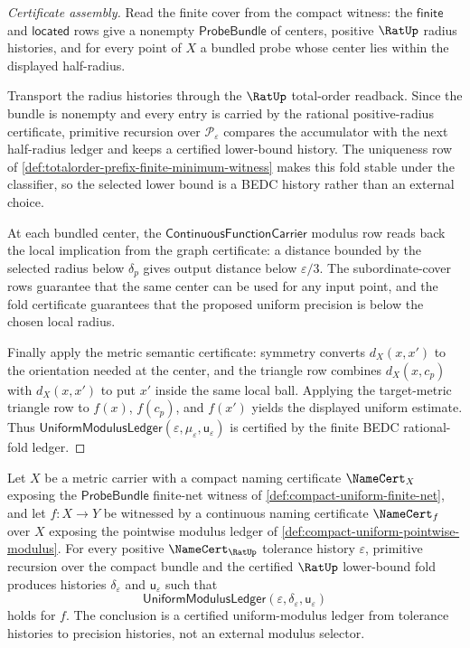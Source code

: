 \begin{proof}[Certificate assembly]
Read the finite cover from the compact witness: the $\mathsf{finite}$ and $\mathsf{located}$ rows give a nonempty $\mathsf{ProbeBundle}$ of centers, positive $\RatUp$ radius histories, and for every point of $X$ a bundled probe whose center lies within the displayed half-radius.

Transport the radius histories through the $\RatUp$ total-order readback. Since the bundle is nonempty and every entry is carried by the rational positive-radius certificate, primitive recursion over $\mathcal{P}_\varepsilon$ compares the accumulator with the next half-radius ledger and keeps a certified lower-bound history. The uniqueness row of \autoref{def:totalorder-prefix-finite-minimum-witness} makes this fold stable under the classifier, so the selected lower bound is a BEDC history rather than an external choice.

At each bundled center, the $\mathsf{ContinuousFunctionCarrier}$ modulus row reads back the local implication from the graph certificate: a distance bounded by the selected radius below $\delta_p$ gives output distance below $\varepsilon/3$. The subordinate-cover rows guarantee that the same center can be used for any input point, and the fold certificate guarantees that the proposed uniform precision is below the chosen local radius.

Finally apply the metric semantic certificate: symmetry converts $d_X(x,x')$ to the orientation needed at the center, and the triangle row combines $d_X(x,c_p)$ with $d_X(x,x')$ to put $x'$ inside the same local ball. Applying the target-metric triangle row to $f(x)$, $f(c_p)$, and $f(x')$ yields the displayed uniform estimate. Thus $\mathsf{UniformModulusLedger}(\varepsilon,\mu_\varepsilon,\mathsf{u}_\varepsilon)$ is certified by the finite BEDC rational-fold ledger.
\end{proof}

\begin{theorem}
\label{thm:compact-uniform-continuity}
Let $X$ be a metric carrier with a compact naming certificate $\NameCert_X$ exposing the $\mathsf{ProbeBundle}$ finite-net witness of \autoref{def:compact-uniform-finite-net}, and let $f \colon X \to Y$ be witnessed by a continuous naming certificate $\NameCert_f$ over $X$ exposing the pointwise modulus ledger of \autoref{def:compact-uniform-pointwise-modulus}. For every positive $\NameCert_{\RatUp}$ tolerance history $\varepsilon$, primitive recursion over the compact bundle and the certified $\RatUp$ lower-bound fold produces histories $\delta_\varepsilon$ and $\mathsf{u}_\varepsilon$ such that
$$
\mathsf{UniformModulusLedger}(\varepsilon,\delta_\varepsilon,\mathsf{u}_\varepsilon)
$$
holds for $f$. The conclusion is a certified uniform-modulus ledger from tolerance histories to precision histories, not an external modulus selector.
\end{theorem}

